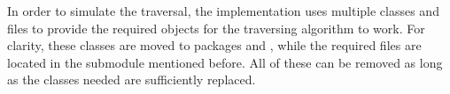 \markdownRendererUlEndTight \markdownRendererOlItemEnd 
\markdownRendererOlEndTight \markdownRendererInterblockSeparator
{}\newpage \shorthandoff{-}\markdownRendererInterblockSeparator
{}
\markdownRendererSectionEnd \markdownRendererSectionBegin
{}\markdownRendererInterblockSeparator
{}In order to simulate the traversal, the implementation uses multiple classes and files to provide the required objects for the traversing algorithm to work. For clarity, these classes are moved to packages  and , while the required files are located in the submodule  mentioned before. All of these can be removed as long as the classes needed are sufficiently replaced. \shorthandon{-}
\markdownRendererSectionEnd 
\markdownRendererSectionEnd \markdownRendererDocumentEnd